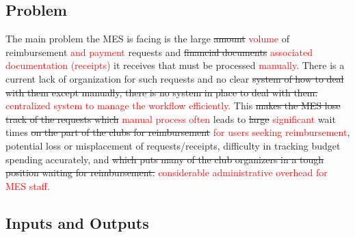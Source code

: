 \documentclass{article}
\begin{document}
\subsection{Problem}

\hspace{0.5cm} The main problem the MES is facing is the large \sout{amount} \textcolor{red}{volume} of reimbursement \textcolor{red}{and payment} requests and \sout{financial documents} \textcolor{red}{associated documentation (receipts)} it receives that must be processed \textcolor{red}{manually}. There is a current lack of organization for such requests and no clear \sout{system of how to deal with them except manually, there is no system in place to deal with them.} \textcolor{red}{centralized system to manage the workflow efficiently.}
This \sout{makes the MES lose track of the requests which} \textcolor{red}{manual process often} leads to \sout{large} \textcolor{red}{significant} wait times \sout{on the part of the clubs for reimbursement} \textcolor{red}{for users seeking reimbursement}, potential loss or misplacement of requests/receipts, difficulty in tracking budget spending accurately, and \sout{which puts many of the club organizers in a tough position waiting for reimbursement.} \textcolor{red}{considerable administrative overhead for MES staff.}

\subsection{Inputs and Outputs}
\end{document}
